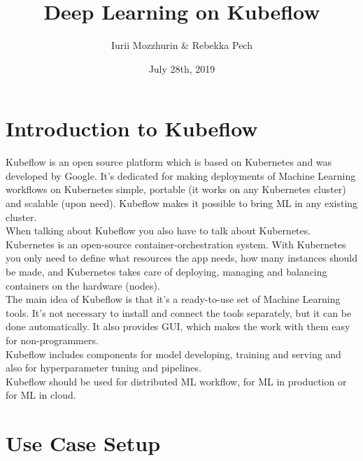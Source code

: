 \documentclass[
	12pt, %
]{fphw}
\title{Deep Learning on Kubeflow} %
\author{ Iurii Mozzhurin \& Rebekka Pech} %
\date{July 28th, 2019} %
\institute{Goethe University Frankfurt am Main}%
\begin{document}
\maketitle %


\vspace{50pt}

\section{Introduction to Kubeflow}

\noindent Kubeflow is an open source platform which is based on Kubernetes and was developed by Google. It's dedicated for making deployments of Machine Learning workflows on Kubernetes simple, portable (it works on any Kubernetes cluster) and scalable (upon need). Kubeflow makes it possible to bring ML in any existing cluster. \\

\noindent When talking about Kubeflow you also have to talk about Kubernetes. Kubernetes is an open-source container-orchestration system. With Kubernetes you only need to define what resources the app needs, how many instances should be made, and Kubernetes takes care of deploying, managing and balancing containers on the hardware (nodes).\\  

\noindent The main idea of Kubeflow is that it's a ready-to-use set of Machine Learning tools. It's not necessary to install and connect the tools separately, but it can be done automatically. It also provides GUI, which makes the work with them easy for non-programmers.\\
Kubeflow includes components for model developing, training and serving and also for hyperparameter tuning and pipelines.\\
Kubeflow should be used for distributed ML workflow, for ML in production or for ML in cloud.
\ \\
\section{Use Case Setup}
\end{document}
